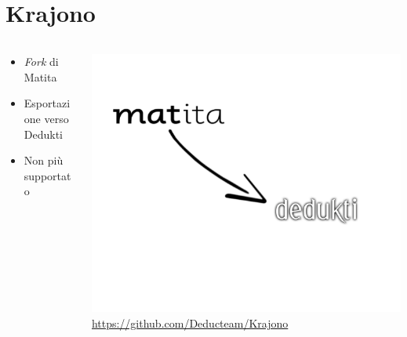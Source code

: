 \documentclass{beamer}
\begin{document}
\section{Krajono}
\begin{frame}

\begin{columns}
\begin{column}{.5\textwidth}
\begin{itemize}
  \item \textit{Fork } di Matita 
  \vspace{1.5em}
  \item Esportazione verso Dedukti
  \vspace{1.5em}
  \item Non più supportato
\end{itemize}
\end{column}
\begin{column}{.5\textwidth}
\includegraphics[scale=0.40]{m2d.png}
  \href{https://github.com/Deducteam/Krajono}{https://github.com/Deducteam/Krajono}
\end{column}
\end{columns}

\end{frame}
\end{document}
